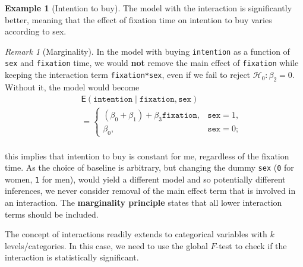 \documentclass[
  11pt,
  letterpaper,
]{scrbook}
\theoremstyle{definition}
\theoremstyle{definition}
\newtheorem{example}{Example}[chapter]
\theoremstyle{plain}
\theoremstyle{plain}
\theoremstyle{remark}
\newtheorem{refremark}{Remark}[chapter]
\begin{document}
\begin{example}[Intention to
buy]
The model with the interaction is significantly better, meaning that the
effect of fixation time on intention to buy varies according to sex.

\end{example}

\begin{refremark}[Marginality]
In the model with buying \texttt{intention} as a function of
\texttt{sex} and \texttt{fixation} time, we would \textbf{not} remove
the main effect of \texttt{fixation} while keeping the interaction term
\texttt{fixation*sex}, even if we fail to reject
\(\mathscr{H}_0:\beta_2=0\). Without it, the model would become
\begin{align*}
&\mathsf{E}(\texttt{intention} \mid \texttt{fixation}, \texttt{sex}) \\\quad&=
\begin{cases}
(\beta_0 + \beta_1) + \beta_3\texttt{fixation}, & \texttt{sex}=1,\\
  \beta_0, &\texttt{sex}=0;                 
\end{cases}
\end{align*}\\
this implies that intention to buy is constant for me, regardless of the
fixation time. As the choice of baseline is arbitrary, but changing the
dummy \texttt{sex} (\texttt{0} for women, \texttt{1} for men), would
yield a different model and so potentially different inferences, we
never consider removal of the main effect term that is involved in an
interaction. The \textbf{marginality principle} states that all lower
interaction terms should be included.

\label{rem-marginality}

\end{refremark}

The concept of interactions readily extends to categorical variables
with \(k\) levels/categories. In this case, we need to use the global
\(F\)-test to check if the interaction is statistically significant.
\end{document}
